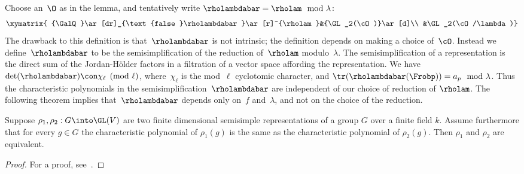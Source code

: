 \documentclass{report}
\begin{document}
Choose an~$\O$ as in the lemma, and tentatively
write $\rholambdabar=\rholam \mod \lambda$:
$$\xymatrix{
{\GalQ}\ar[dr]_{\text{false }\rholambdabar}\ar[r]^{\rholam}&{\GL_2(\cO)}\ar[d]\\
               &\GL_2(\cO/\lambda)}$$
The drawback to this definition is
that~$\rholambdabar$ is not intrinsic;
the definition depends on making a choice of~$\cO$.
Instead we define~$\rholambdabar$ to be
the semisimplification of the reduction of~$\rholam$
modulo~$\lambda$. The semisimplification of a representation is
the direct sum of the Jordan-H\"older factors in a filtration
of a vector space affording the representation.
We have $\det(\rholambdabar)\con \chi_{\ell}\pmod{\ell}$,
where~$\chi_\ell$ is the mod~$\ell$ cyclotomic character,
and $\tr(\rholambdabar(\Frobp)) =a_p\mod\lambda$.
Thus the characteristic polynomials in the
semisimplification~$\rholambdabar$
are independent of our choice of reduction of $\rholam$.
The following theorem implies
that~$\rholambdabar$ depends only on~$f$ and~$\lambda$,
and not on the choice of the reduction.
\begin{theorem}  Suppose
$\rho_1,\rho_2:G\into\GL(V)$ are two finite dimensional
semisimple representations of a group $G$ over a finite
field $k$. Assume furthermore that
for every $g\in G$ the characteristic polynomial
of $\rho_1(g)$ is the same as the characteristic polynomial
of $\rho_2(g)$. Then $\rho_1$ and $\rho_2$ are equivalent.
\end{theorem}
\begin{proof}
For a proof, see~\cite[\S30, p.~215]{curtis-reiner}.
\end{proof}
\end{document}
